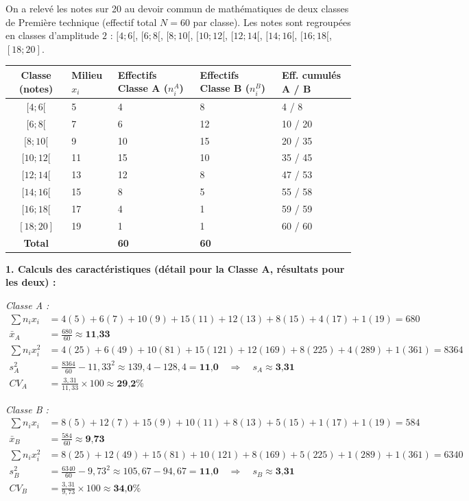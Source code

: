 \documentclass[11pt]{article}
\begin{document}
\begin{exemplebox}
On a relevé les notes sur 20 au devoir commun de mathématiques de deux classes de Première technique (effectif total $N=60$ par classe). Les notes sont regroupées en classes d'amplitude $2$ : $[4;6[$, $[6;8[$, $[8;10[$, $[10;12[$, $[12;14[$, $[14;16[$, $[16;18[$, $[18;20]$.

\begin{center}
\begin{tabularx}{\linewidth}{|c|X|X|X|X|}\hline
\rowcolor{popblueL}
\textbf{Classe (notes)} & \textbf{Milieu $x_i$} & \textbf{Effectifs Classe A ($n_i^A$)} & \textbf{Effectifs Classe B ($n_i^B$)} & \textbf{Eff. cumulés A / B} \\ \hline
$[4;6[$ & 5 & 4 & 8 & 4 / 8 \\
$[6;8[$ & 7 & 6 & 12 & 10 / 20 \\
$[8;10[$ & 9 & 10 & 15 & 20 / 35 \\
$[10;12[$ & 11 & 15 & 10 & 35 / 45 \\
$[12;14[$ & 13 & 12 & 8 & 47 / 53 \\
$[14;16[$ & 15 & 8 & 5 & 55 / 58 \\
$[16;18[$ & 17 & 4 & 1 & 59 / 59 \\
$[18;20]$ & 19 & 1 & 1 & 60 / 60 \\ \hline
\textbf{Total} & & \textbf{60} & \textbf{60} & \\ \hline
\end{tabularx}
\end{center}

\textbf{1. Calculs des caractéristiques (détail pour la Classe A, résultats pour les deux) :}

\emph{Classe A :}
\begin{align*}
\sum n_i x_i &= 4(5) + 6(7) + 10(9) + 15(11) + 12(13) + 8(15) + 4(17) + 1(19) = 680 \\
\bar{x}_A &= \frac{680}{60} \approx \textbf{11,33} \\
\sum n_i x_i^2 &= 4(25) + 6(49) + 10(81) + 15(121) + 12(169) + 8(225) + 4(289) + 1(361) = 8364 \\
s_A^2 &= \frac{8364}{60} - 11,33^2 \approx 139,4 - 128,4 = \textbf{11,0} \quad \Rightarrow \quad s_A \approx \textbf{3,31} \\
CV_A &= \frac{3,31}{11,33} \times 100 \approx \textbf{29,2\%}
\end{align*}

\emph{Classe B :}
\begin{align*}
\sum n_i x_i &= 8(5) + 12(7) + 15(9) + 10(11) + 8(13) + 5(15) + 1(17) + 1(19) = 584 \\
\bar{x}_B &= \frac{584}{60} \approx \textbf{9,73} \\
\sum n_i x_i^2 &= 8(25) + 12(49) + 15(81) + 10(121) + 8(169) + 5(225) + 1(289) + 1(361) = 6340 \\
s_B^2 &= \frac{6340}{60} - 9,73^2 \approx 105,67 - 94,67 = \textbf{11,0} \quad \Rightarrow \quad s_B \approx \textbf{3,31} \\
CV_B &= \frac{3,31}{9,73} \times 100 \approx \textbf{34,0\%}
\end{align*}


\end{exemplebox}
\end{document}

